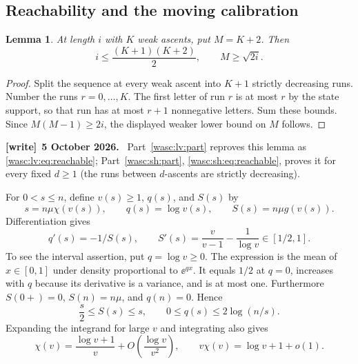 \documentclass[11pt,a4paper]{article}
\newtheorem{lemma}[theorem]{Lemma}
\theoremstyle{remark}\newtheorem{remark}[theorem]{Remark}
\numberwithin{equation}{section}
\newenvironment{writenote}[1][]{\par\smallskip\begingroup\small
 \noindent\textbf{[write]}\if\relax\detokenize{#1}\relax\else~\textbf{#1.}\fi\ }%
 {\par\endgroup\smallskip}
\begin{document}
\subsection{Reachability and the moving calibration}
\begin{lemma}\label{wasc:gr:lem:geometry}
At length $i$ with $K$ weak ascents, put $M=K+2$. Then
\begin{equation}\label{wasc:gr:eq:geometry}
i\le\frac{(K+1)(K+2)}2,\qquad M\ge\sqrt{2i}.
\end{equation}
\end{lemma}
\begin{proof}
Split the sequence at every weak ascent into $K+1$ strictly decreasing runs. Number the runs $r=0,\ldots,K$. The first letter of run $r$ is at most $r$ by the state support, so that run has at most $r+1$ nonnegative letters. Sum these bounds. Since $M(M-1)\ge2i$, the displayed weaker lower bound on $M$ follows.
\end{proof}
\begin{writenote}[5 October 2026]
Part~\ref{wasc:lv:part} reproves this lemma as \eqref{wasc:lv:eq:reachable}; Part~\ref{wasc:sh:part}, \eqref{wasc:sh:eq:reachable}, proves it for every fixed $d\ge1$ (the runs between $d$-ascents are strictly decreasing).
\end{writenote}

For $0<s\le n$, define $v(s)\ge1$, $q(s)$, and $S(s)$ by
\begin{equation}\label{wasc:gr:eq:movingcalibration}
s=n\mu\chi(v(s)),\qquad q(s)=\log v(s),\qquad
S(s)=n\mu g(v(s)).
\end{equation}
Differentiation gives
\begin{equation}\label{wasc:gr:eq:Sderivative}
q'(s)=-1/S(s),\qquad
S'(s)=\frac{v}{v-1}-\frac1{\log v}\in[1/2,1].
\end{equation}
To see the interval assertion, put $q=\log v\ge0$. The expression is the mean of $x\in[0,1]$ under density proportional to $\ee^{qx}$. It equals $1/2$ at $q=0$, increases with $q$ because its derivative is a variance, and is at most one. Furthermore $S(0+)=0$, $S(n)=n\mu$, and $q(n)=0$. Hence
\begin{equation}\label{wasc:gr:eq:Sqbounds}
\frac s2\le S(s)\le s,\qquad 0\le q(s)\le2\log(n/s).
\end{equation}
Expanding the integrand for large $v$ and integrating also gives
\begin{equation}\label{wasc:gr:eq:chiasymptotic}
\chi(v)=\frac{\log v+1}{v}+O\!\left(\frac{\log v}{v^2}\right),
\qquad v\chi(v)=\log v+1+o(1).
\end{equation}
\end{document}
